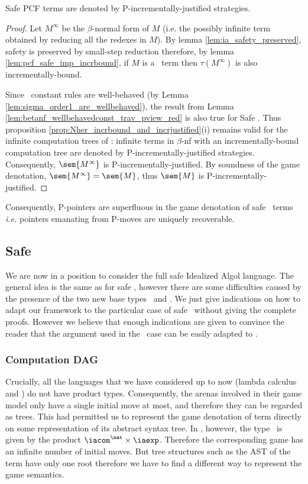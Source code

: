 \begin{theorem}
Safe PCF terms are denoted by P-incrementally-justified strategies.
\end{theorem}
\begin{proof}
Let $M^{\infty}$ be the $\beta$-normal form of $M$ (i.e. the possibly infinite term obtained by reducing all the redexes in $M$). By lemma \ref{lem:ia_safety_preserved}, safety is preserved by small-step reduction therefore, by lemma \ref{lem:pcf_safe_imp_incrbound}, if $M$ is a \pcf\ term then $\tau(M^{\infty})$ is also
incrementally-bound.

Since \pcf\ constant rules are well-behaved (by Lemma
\ref{lem:sigma_order1_are_wellbehaved}), the result from Lemma
\ref{lem:betanf_wellbehavedconst_trav_pview_red} is also true for
Safe \pcf. Thus proposition
\ref{prop:Nher_incrbound_and_incrjustified}(i) remains valid for the
infinite computation trees of \pcf: infinite terms in $\beta$-nf
with an incrementally-bound computation tree are denoted by
P-incrementally-justified strategies. Consequently,
$\sem{M^{\infty}}$ is P-incrementally-justified. By soundness of the
game denotation, $\sem{M^{\infty}} = \sem{M}$, thus $\sem{M}$ is
P-incrementally-justified.
\end{proof}

Consequently, P-pointers are superfluous in the game denotation of safe \pcf\ terms {\it i.e.} pointers emanating from P-moves are uniquely recoverable.

\subsection{Safe \ialgol}

We are now in a position to consider the full safe Idealized Algol
language. The general idea is the same as for safe \pcf, however
there are some difficulties caused by the presence of the two new
base types \iavar\ and \iacom. We just give indications on how to
adapt our framework to the particular case of safe \ialgol\ without
giving the complete proofs. However we believe that enough
indications are given to convince the reader that the argument used
in the \pcf\ case can be easily adapted to \ialgol.

\subsubsection{Computation DAG}
Crucially, all the languages that we have considered up to now (lambda calculus and \pcf) do not have product types. Consequently, the arenas involved in their game model only have a single initial move at most, and therefore they can be
regarded as trees. This had permitted us to represent the game denotation of term directly on some representation of its abstract syntax tree. In \ialgol, however, the type \iavar\ is given by the product $\iacom^{\nat} \times \iaexp$. Therefore the corresponding game has an infinite number of initial moves. But tree structures such as the AST of the term have only one root therefore we have to find a different way to represent the game semantics.

